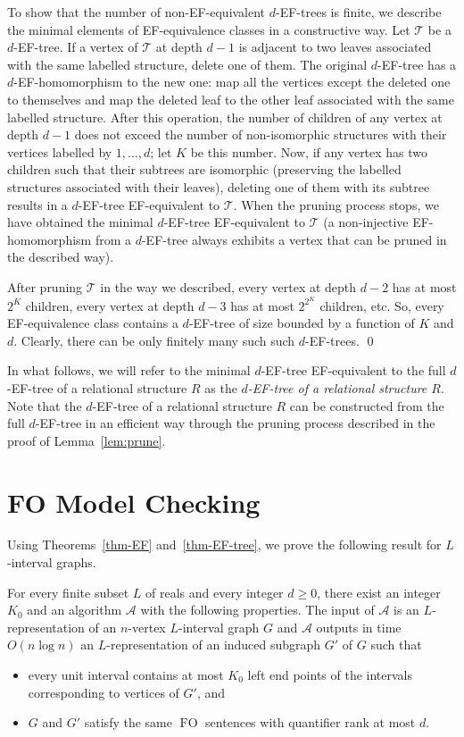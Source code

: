 \documentclass{CSML}
\newcommand{\FO}{\ensuremath{\operatorname{FO}}\xspace}
\newcommand{\cA}{\mathcal{A}}
\newcommand{\TT}{\mathcal{T}}
\theoremstyle{plain}\newtheorem{claim}[thm]{Claim}
\begin{document}
To show that the number of non-EF-equivalent $d$-EF-trees is finite,
we describe the minimal elements of EF-equivalence classes in a constructive way.
Let $\TT$ be a $d$-EF-tree.
If a vertex of $\TT$ at depth $d-1$ is adjacent to two leaves associated with the same labelled structure,
delete one of them.
The original $d$-EF-tree has a $d$-EF-homomorphism to the new one: map all the vertices except the deleted one to themselves and
map the deleted leaf to the other leaf associated with the same labelled structure.
After this operation, the number of children of any vertex at depth $d-1$ does not exceed the number of non-isomorphic
structures with their vertices labelled by $1,\ldots,d$; let $K$ be this number.
Now, if any vertex has two children such that their subtrees are isomorphic (preserving the labelled structures associated with their leaves),
deleting one of them with its subtree results in a $d$-EF-tree EF-equivalent to $\TT$.
When the pruning process stops, we have obtained the minimal $d$-EF-tree EF-equivalent to $\TT$ (a non-injective EF-homomorphism
from a $d$-EF-tree always exhibits a vertex that can be pruned in the described way).

After pruning $\TT$ in the way we described, every vertex at depth $d-2$ has at most $2^K$ children,
every vertex at depth $d-3$ has at most $2^{2^K}$ children, etc.
So, every EF-equivalence class contains a $d$-EF-tree of size bounded by a function of $K$ and $d$.
Clearly, there can be only finitely many such such $d$-EF-trees.
\qed

In what follows, we will refer to the minimal $d$-EF-tree EF-equivalent to the full $d$-EF-tree of a relational structure $R$ as
the {\em$d$-EF-tree of a relational structure $R$}.
Note that the $d$-EF-tree of a relational structure $R$ can be constructed from the full $d$-EF-tree in an efficient way
through the pruning process described in the proof of Lemma~\ref{lem:prune}.

\section{FO Model Checking}
Using Theorems~\ref{thm-EF} and~\ref{thm-EF-tree},
we prove the following result for $L$-interval graphs.

\begin{thm}
\label{thm-kernel}
For every finite subset $L$ of reals and every integer $d\geq0$, there exist an integer $K_0$ and
an algorithm $\cA$ with the following properties. The input of $\cA$ is an $L$-representation
of an $n$-vertex $L$-interval graph $G$ and $\cA$ outputs in time $O(n\log n)$
an $L$-representation of an induced subgraph $G'$ of $G$ such that
\begin{itemize}
\item every unit interval contains at most $K_0$ left end points of the intervals
      corresponding to vertices of $G'$, and
\item $G$ and $G'$ satisfy the same \FO sentences with quantifier rank at most $d$.
\end{itemize}
\end{thm}
\end{document}
